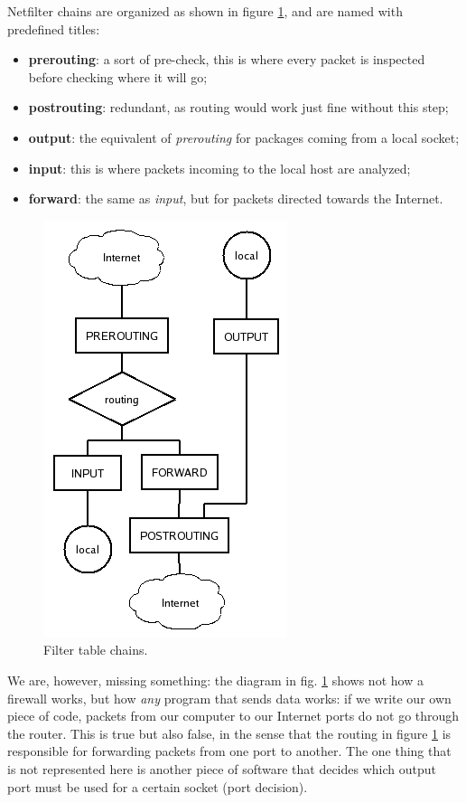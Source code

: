 Netfilter chains are organized as shown in figure \ref{fig:netfilter_chains}, and are named with predefined titles:

\begin{itemize}
    \item \textbf{prerouting}: a sort of pre-check, this is where every packet is inspected before checking where it will go;
    \item \textbf{postrouting}: redundant, as routing would work just fine without this step;
    \item \textbf{output}: the equivalent of \textit{prerouting} for packages coming from a local socket;
    \item \textbf{input}: this is where packets incoming to the local host are analyzed;
    \item \textbf{forward}: the same as \textit{input}, but for packets directed towards the Internet.
\end{itemize}

\begin{figure}[h]
    \centering
    \includegraphics[scale=1]{img/netfilter_chains.png}
    \decoRule
    \caption{Filter table chains.}
    \label{fig:netfilter_chains}
\end{figure}

We are, however, missing something: the diagram in fig. \ref{fig:netfilter_chains} shows not how a firewall works, but how \textit{any} program that sends data works: if we write our own piece of code, packets from our computer to our Internet ports do not go through the router. This is true but also false, in the sense that the routing in figure \ref{fig:netfilter_chains} is responsible for forwarding packets from one port to another. The one thing that is not represented here is another piece of software that decides which output port must be used for a certain socket (port decision).

